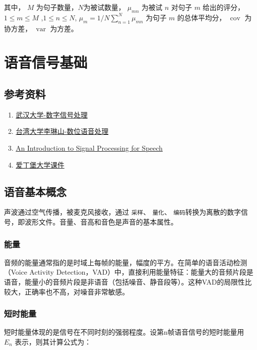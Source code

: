 \documentclass[cn,10pt,math=newtx,citestyle=gb7714-2015,bibstyle=gb7714-2015]{elegantbook}
\begin{document}
其中， $M$ 为句子数量，$N$为被试数量， $\mu_{mn}$ 为被试 $n$ 对句子 $m$ 给出的评分，$1\leq m\leq M$ ,$1\leq n\leq N$, $\mu_m=1/N\sum_{n=1}^N\mu_{mn}$ 为句子 $m$ 的总体平均分， $\mathop{cov}$ 为协方差， $\mathop{var}$ 为方差。

\chapter{语音信号基础}

\section{参考资料}

\begin{enumerate}
  \item \href{http://dsp.whu.edu.cn/syszy/szxin_hao_chu.htm}{武汉大学-数字信号处理}
  \item \href{http://speech.ee.ntu.edu.tw/SS2020Spring/}{台湾大学李琳山-数位语音处理}
  \item \href{http://labrosa.ee.columbia.edu/~dpwe/pubs/Ellis10-introspeech.pdf}{An Introduction to Signal Processing for Speech}
  \item \href{https://www.inf.ed.ac.uk/teaching/courses/asr/2020-21/asr02-signal.pdf}{爱丁堡大学课件}
\end{enumerate}

\section{语音基本概念}
声波通过空气传播，被麦克风接收，通过 \lstinline{采样}、 \lstinline{量化}、 \lstinline{编码}转换为离散的数字信号，即波形文件。音量、音高和音色是声音的基本属性。

\subsection{能量}

音频的能量通常指的是时域上每帧的能量，幅度的平方。在简单的语音活动检测（Voice Activity Detection，VAD）中，直接利用能量特征：能量大的音频片段是语音，能量小的音频片段是非语音（包括噪音、静音段等）。这种VAD的局限性比较大，正确率也不高，对噪音非常敏感。

\subsection{短时能量}

短时能量体现的是信号在不同时刻的强弱程度。设第n帧语音信号的短时能量用 $E_n$ 表示，则其计算公式为：
\end{document}
